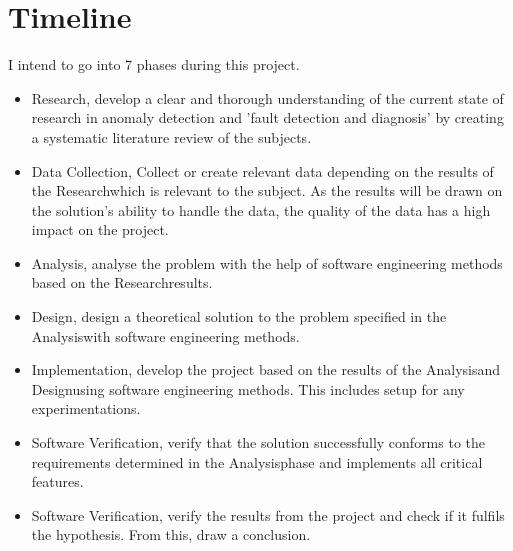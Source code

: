 \documentclass[a4paper,8pt]{article}
\newcommand{\Phases}{7 }
\newcommand{\phaseq}{Research}
\newcommand{\phasew}{Data Collection}
\newcommand{\phasee}{Analysis}
\newcommand{\phaser}{Design}
\newcommand{\phaset}{Implementation}
\newcommand{\phasey}{Software Verification}
\begin{document}
	\section{Timeline}
	I intend to go into \Phases phases during this project.
		\begin{itemize}
			\item \phaseq, develop a clear and thorough understanding of the current state of research in anomaly detection and 'fault detection and diagnosis' by creating a systematic literature review of the subjects.
			\item \phasew, Collect or create relevant data depending on the results of the \phaseq \space which is relevant to the subject. As the results will be drawn on the solution's ability to handle the data, the quality of the data has a high impact on the project.
			\item \phasee, analyse the problem with the help of software engineering methods based on the \phaseq \space results.
			\item \phaser, design a theoretical solution to the problem specified in the \phasee \space with software engineering methods.
			\item \phaset, develop the project based on the results of the \phasee \space and \phaser \space using software engineering methods. This includes setup for any experimentations.
			\item \phasey, verify that the solution successfully conforms to the requirements determined in the \phasee \space phase and implements all critical features.
			\item \phasey, verify the results from the project and check if it fulfils the hypothesis. From this, draw a conclusion.
		\end{itemize}
	
\end{document}

